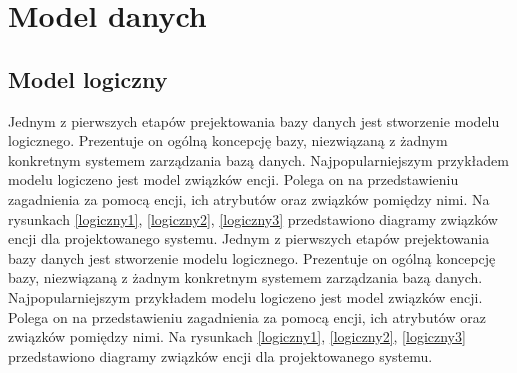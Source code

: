 \chapter{Model danych}

\section[Model logiczny][Model logiczny]{Model logiczny}
Jednym z pierwszych etapów prejektowania bazy danych jest stworzenie modelu logicznego. Prezentuje on ogólną koncepcję bazy, niezwiązaną z żadnym konkretnym systemem zarządzania bazą danych. Najpopularniejszym przykładem modelu logiczeno jest model związków encji. Polega on na przedstawieniu zagadnienia za pomocą encji, ich atrybutów oraz związków pomiędzy nimi. Na rysunkach \ref{logiczny1}, \ref{logiczny2}, \ref{logiczny3} przedstawiono diagramy związków encji dla projektowanego systemu.
Jednym z pierwszych etapów prejektowania bazy danych jest stworzenie modelu logicznego. Prezentuje on ogólną koncepcję bazy, niezwiązaną z żadnym konkretnym systemem zarządzania bazą danych. Najpopularniejszym przykładem modelu logiczeno jest model związków encji. Polega on na przedstawieniu zagadnienia za pomocą encji, ich atrybutów oraz związków pomiędzy nimi. Na rysunkach \ref{logiczny1}, \ref{logiczny2}, \ref{logiczny3} przedstawiono diagramy związków encji dla projektowanego systemu.


